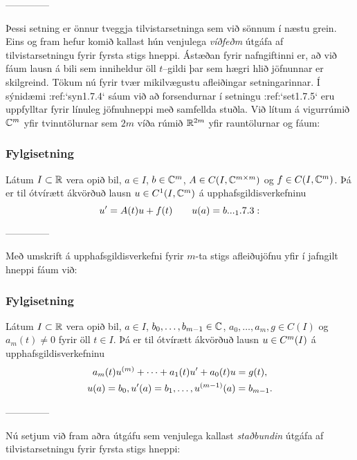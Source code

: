 --------------



Þessi setning er önnur tveggja tilvistarsetninga sem við sönnum í
næstu grein.  Eins og fram hefur komið kallast hún
venjulega {\it víðfeðm} útgáfa af tilvistarsetningu fyrir
fyrsta stigs hneppi. Ástæðan fyrir nafngiftinni er, að við fáum
lausn á bili sem inniheldur öll $t$--gildi þar sem hægri hlið
jöfnunnar er skilgreind.
Tökum nú fyrir 
tvær mikilvægustu afleiðingar setningarinnar.  Í sýnidæmi
:ref:`syn1.7.4`
sáum við að forsendurnar í setningu :ref:`set1.7.5` eru uppfylltar fyrir línuleg
jöfnuhneppi með samfellda stuðla.  Við lítum á vigurrúmið ${\mathbb C}^m$ yfir
tvinntölurnar sem $2m$ víða rúmið ${\mathbb R}^{2m}$ yfir rauntölurnar og fáum: 

\subsubsection{Fylgisetning}
Látum $I\subset {\mathbb R}$ vera opið bil, $a\in I$, $b\in {\mathbb C}\sp m$,
$A\in C(I,{\mathbb C}\sp{m\times m})$ og $f\in C(I,{\mathbb C}\sp m)$. Þá er til
ótvírætt ákvörðuð lausn  
$u\in C\sp 1(I,{\mathbb C}\sp m)$ á upphafsgildisverkefninu
 \begin{equation*}u\dash=A(t)u+f(t) \qquad u(a)=b.

.. _1.7.3:

 \end{equation*}


--------------



Með umskrift á upphafsgildisverkefni fyrir $m$-ta stigs afleiðujöfnu
yfir í jafngilt hneppi fáum við:

\subsubsection{Fylgisetning}
Látum $I\subset {\mathbb R}$ vera opið bil, $a\in I$,
$b_0,\dots,b_{m-1} \in {\mathbb C}$, $a_0,\dots,a_m, g\in C(I)$ og $a_m(t)\neq 0$
fyrir öll $t\in I$.
Þá er til ótvírætt ákvörðuð lausn  
$u\in C\sp m(I)$ á upphafsgildisverkefninu
\begin{gather*}
a_m(t)u\sp {(m)}+\cdots+a_1(t)u{\sp{\prime}}+a_0(t)u=g(t),\\
u(a)=b_0, u{\sp{\prime}}(a)=b_1,\dots, u\sp{(m-1)}(a)=b_{m-1}.
\end{gather*}


--------------



Nú setjum við fram aðra útgáfu sem venjulega
kallast {\it staðbundin} útgáfa af tilvistarsetningu fyrir fyrsta
stigs hneppi:



